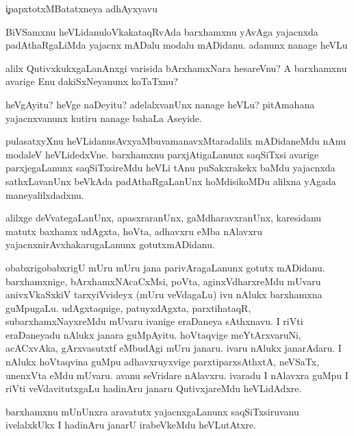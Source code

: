 \begin{mng}
\c{ipapxtotxMBatatxneya adhAyxyavu}
\end{mng}

\begin{mng}
BiVSamxnu heVLidanu\mdash loVkakataqRvAda barxhamxnu yAvAga yajacnxda padAthaRgaLiMda yajacnx mADalu modalu mADidanu. adanunx nanage heVLu
\end{mng}

\begin{mng}
alilx QutivxkukxgaLanAnxgi varisida bArxhamxNara hesareVnu? A barxhamxnu avarige Enu dakiSxNeyanunx koTaTxnu?
\end{mng}

\begin{mng}
heVgAyitu? heVge naDeyitu? adelalxvanUnx nanage heVLu? pitAmahana yajacnxvanunx kutiru nanage bahaLa Aseyide.
\end{mng}

\begin{mng}
pulasatxyXnu heVLidanu\mdash sAvxyaMbuvamanavxMtaradalilx mADidaneMdu nAnu modaleV heVLidedxVne. barxhamxnu parxjAtigaLanunx saqSiTxsi avarige parxjegaLanunx saqSiTxsireMdu heVLi tAnu puSakxrakekx baMdu yajacnxda sathxLavanUnx beVkAda padAthaRgaLanUnx hoMdisikoMDu alilxna yAgada maneyalilxdadxnu.
\end{mng}

\begin{mng}
alilxge deVvategaLanUnx, apasxraranUnx, gaMdharavxranUnx, karesidanu matutx baxhamx udAgxta, hoVta, adhavxru eMba nAlavxru yajacnxnirAvxhakarugaLanunx gotutxmADidanu.
\end{mng}

\begin{mng}
obabxrigobabxrigU mUru mUru jana parivAragaLanunx gotutx mADidanu. barxhamxnige, bArxhamxNAcaCxMsi, poVta, aginxVdharxreMdu mUvaru anivxVkaSxkiV tarxyiVvideyx (mUru veVdagaLu) ivu nAlukx barxhamxna guMpugaLu. udAgxtaqnige, patuyxdAgxta, parxtihataqR, subarxhamxNayxreMdu mUvaru ivanige eraDaneya sAthxnavu. I riVti eraDaneyadu nAlukx janara guMpAyitu. hoVtaqvige meYtArxvaruNi, acACxvAka, gArxvasutxtf eMbudAgi mUru janaru. ivaru nAlukx janarAdaru. I nAlukx hoVtaqvina guMpu adhavxruyxvige parxtiparxsAthxtA, neVSaTx, unenxVta eMdu mUvaru. avanu seVridare nAlavxru. ivaradu I nAlavxra guMpu I riVti veVdavitutxgaLu hadinAru janaru QutivxjareMdu heVLidAdxre.
\end{mng}

\begin{mng}
barxhamxnu mUnUnxra aravatutx yajacnxgaLanunx saqSiTxsiruvanu ivelalxkUkx I hadinAru janarU irabeVkeMdu heVLutAtxre.
\end{mng}


